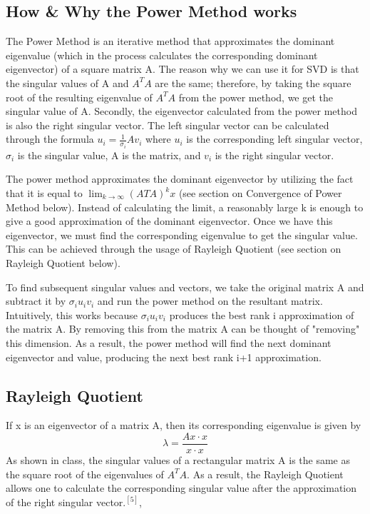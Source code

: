 \documentclass[12pt]{article}
\begin{document}
\subsection{How \& Why the Power Method works}
\vspace{-5pt}
\hspace{24pt}The Power Method is an iterative method that approximates the dominant eigenvalue (which in the process calculates the corresponding dominant eigenvector) of a square matrix A. The reason why we can use it for SVD is that the singular values of A and $A^TA$ are the same; therefore, by taking the square root of the resulting eigenvalue of $A^TA$ from the power method, we get the singular value of A. Secondly, the eigenvector calculated from the power method is also the right singular vector. The left singular vector can be calculated through the formula $u_i = \frac{1}{\sigma_i}Av_i$ where $u_i$ is the corresponding left singular vector, $\sigma_i$ is the singular value, A is the matrix, and $v_i$ is the right singular vector.

\hspace{24pt}The power method approximates the dominant eigenvector by utilizing the fact that it is equal to $\lim_{k \to \infty} (ATA)^kx$ (see section on Convergence of Power Method below). Instead of calculating the limit, a reasonably large k is enough to give a good approximation of the dominant eigenvector. Once we have this eigenvector, we must find the corresponding eigenvalue to get the singular value. This can be achieved through the usage of Rayleigh Quotient (see section on Rayleigh Quotient below).

\hspace{24pt}To find subsequent singular values and vectors, we take the original matrix A and subtract it by $\sigma_i u_i v_i$ and run the power method on the resultant matrix. Intuitively, this works because $\sigma_i u_i v_i$ produces the best rank i approximation of the matrix A. By removing this from the matrix A can be thought of "removing" this dimension. As a result, the power method will find the next dominant eigenvector and value, producing the next best rank i+1 approximation.

\vspace{-5pt}
\subsection{Rayleigh Quotient}
If x is an eigenvector of a matrix A, then its corresponding eigenvalue is given by $$\lambda = \dfrac{Ax \cdot x}{x \cdot x}$$ As shown in class, the singular values of a rectangular matrix A is the same as the square root of the eigenvalues of $A^TA$. As a result, the Rayleigh Quotient allows one to calculate the corresponding singular value after the approximation of the right singular vector.$^{[5]}$,
\end{document}
